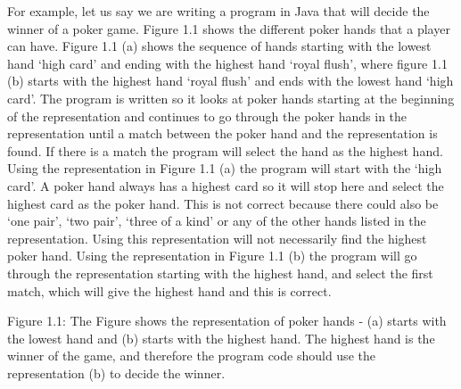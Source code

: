 For example, let us say we are writing a program in Java that will decide the winner of a poker game. Figure 1.1 shows the different poker hands that a player can have. Figure 1.1 (a) shows the sequence of hands starting with the lowest hand `high card' and ending with the highest hand `royal flush', where figure 1.1 (b) starts with the highest hand `royal flush' and ends with the lowest hand `high card'.
The program is written so it looks at poker hands starting at the beginning of the representation and continues to go through the poker hands in the representation until a match between the poker hand and the representation is found. If there is a match the program will select the hand as the highest hand.
Using the representation in Figure 1.1 (a) the program will start with the `high card'. A poker hand always has a highest card so it will stop here and select the highest card as the poker hand. This is not correct because there could also be `one pair', `two pair', `three of a kind' or any of the other hands listed in the representation. Using this representation will not necessarily find the highest poker hand.      
Using the representation in Figure 1.1 (b) the program will go through the representation starting with the highest hand, and select the first match, which will give the highest hand and this is correct.

Figure 1.1: The Figure shows the representation of poker hands - (a) starts with the lowest hand and (b) starts with the highest hand. The highest hand is the winner of the game, and therefore the program code should use the representation (b) to decide the winner.  




